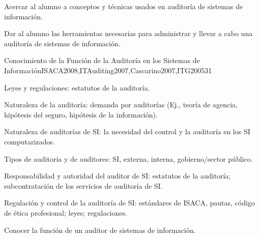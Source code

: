 \begin{syllabus}
\begin{goals}
\item Acercar al alumno a conceptos y técnicas usados en auditoría de sistemas de información.
\item Dar al alumno las herramientas necesarias para administrar y llevar a cabo una auditoría de sistemas de información.
\end{goals}

\begin{outcomes}
\end{outcomes}

\begin{unit}{Conocimiento de la Función de la Auditoría en los Sistemas de Información}{ISACA2008,ITAuditing2007,Cascarino2007,ITG2005}{3}{1}
    \begin{topics}
		\item Leyes y regulaciones: estatutos de la auditoría.
		\item Naturaleza de la auditoría: demanda por auditorías (Ej., teoría de agencia, hipótesis del seguro, hipótesis de la información).
		\item Naturaleza de auditorías de SI: la necesidad del control y la auditoría en los SI computarizados.
		\item Tipos de auditoría y de auditores: SI, externa, interna, gobierno/sector público.
		\item Responsabilidad y autoridad del auditor de SI: estatutos de la auditoría; subcontratación de los servicios de auditoría de SI.
		\item Regulación y control de la auditoría de SI: estándares de ISACA, pautas, código de ética profesional; leyes; regulaciones.
    \end{topics}
    \begin{unitgoals}
	\item Conocer la función de un auditor de sistemas de información.
    \end{unitgoals}
\end{unit}


\end{syllabus}
